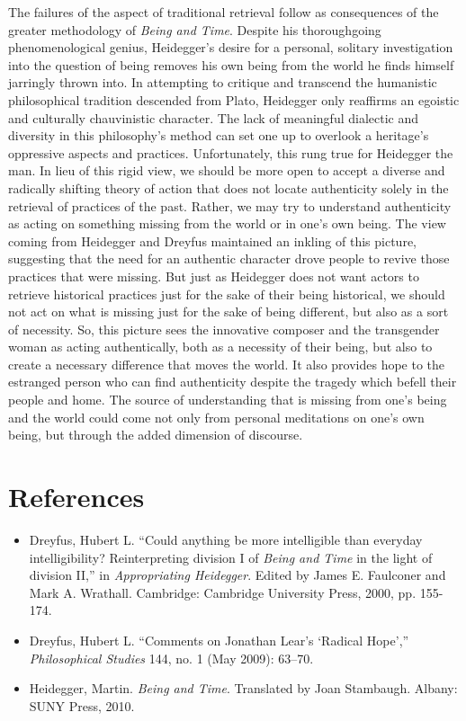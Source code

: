 The failures of the aspect of traditional retrieval follow as
consequences of the greater methodology of \emph{Being and Time}.
Despite his thoroughgoing phenomenological genius, Heidegger's desire
for a personal, solitary investigation into the question of being
removes his own being from the world he finds himself jarringly thrown
into. In attempting to critique and transcend the humanistic
philosophical tradition descended from Plato, Heidegger only reaffirms
an egoistic and culturally chauvinistic character. The lack of
meaningful dialectic and diversity in this philosophy's method can set
one up to overlook a heritage's oppressive aspects and practices.
Unfortunately, this rung true for Heidegger the man. In lieu of this
rigid view, we should be more open to accept a diverse and radically
shifting theory of action that does not locate authenticity solely in
the retrieval of practices of the past. Rather, we may try to understand
authenticity as acting on something missing from the world or in one's
own being. The view coming from Heidegger and Dreyfus maintained an
inkling of this picture, suggesting that the need for an authentic
character drove people to revive those practices that were missing. But
just as Heidegger does not want actors to retrieve historical practices
just for the sake of their being historical, we should not act on what
is missing just for the sake of being different, but also as a sort of
necessity. So, this picture sees the innovative composer and the
transgender woman as acting authentically, both as a necessity of their
being, but also to create a necessary difference that moves the world.
It also provides hope to the estranged person who can find authenticity
despite the tragedy which befell their people and home. The source of
understanding that is missing from one's being and the world could come
not only from personal meditations on one's own being, but through the
added dimension of discourse.

\section*{References}

\begin{itemize}[label={},itemindent=-2em,leftmargin=2em]
	\item Dreyfus, Hubert L. ``Could anything be more intelligible than everyday intelligibility? Reinterpreting division I of \emph{Being and Time} in
  the light of division II,'' in \emph{Appropriating Heidegger}. Edited by James E. Faulconer and Mark A. Wrathall. Cambridge: Cambridge University Press, 2000, pp. 155-174.
	\item Dreyfus, Hubert L. ``Comments on Jonathan Lear's `Radical Hope','' \emph{Philosophical Studies} 144, no. 1 (May 2009): 63--70.
	\item Heidegger, Martin. \emph{Being and Time}. Translated by Joan Stambaugh. Albany: SUNY Press, 2010. 
\end{itemize}